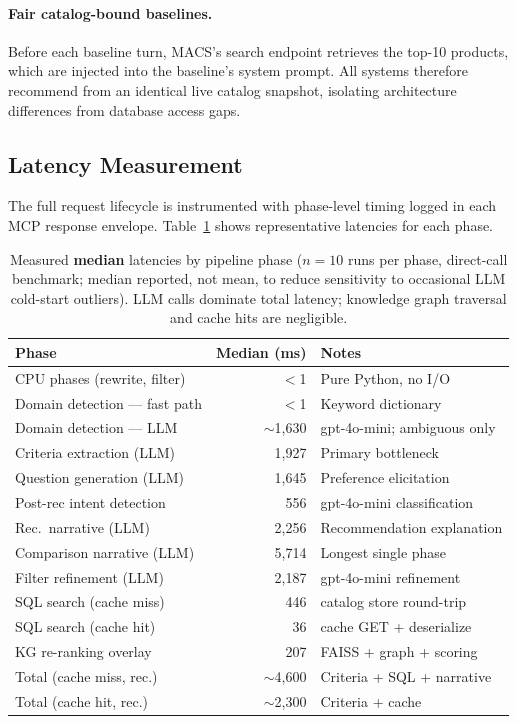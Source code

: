 \documentclass[sigconf,anonymous]{acmart}
\begin{document}
\paragraph{Fair catalog-bound baselines.}
Before each baseline turn, MACS's search endpoint retrieves the top-10
products, which are injected into the baseline's system prompt. All systems
therefore recommend from an identical live catalog snapshot, isolating
architecture differences from database access gaps.

\subsection{Latency Measurement}

The full request lifecycle is instrumented with phase-level timing logged in
each MCP response envelope. Table~\ref{tab:latency} shows representative
latencies for each phase.

\begin{table}[t]
  \caption{Measured \textbf{median} latencies by pipeline phase ($n = 10$
  runs per phase, direct-call benchmark; median reported, not mean, to
  reduce sensitivity to occasional LLM cold-start outliers). LLM calls
  dominate total latency; knowledge graph traversal and cache hits are
  negligible.}
  \label{tab:latency}
  \small
  \begin{tabular}{@{}lrp{2.5cm}@{}}
    \toprule
    Phase & Median (ms) & Notes \\
    \midrule
    CPU phases (rewrite, filter)  &   $<$1        & Pure Python, no I/O \\
    Domain detection — fast path  &   $<$1        & Keyword dictionary \\
    Domain detection — LLM        & $\sim$1{,}630 & gpt-4o-mini; ambiguous only \\
    Criteria extraction (LLM)     & 1{,}927       & Primary bottleneck \\
    Question generation (LLM)     & 1{,}645       & Preference elicitation \\
    Post-rec intent detection     &   556         & gpt-4o-mini classification \\
    Rec.\ narrative (LLM)         & 2{,}256       & Recommendation explanation \\
    Comparison narrative (LLM)    & 5{,}714       & Longest single phase \\
    Filter refinement (LLM)       & 2{,}187       & gpt-4o-mini refinement \\
    SQL search (cache miss)       &   446         & catalog store round-trip \\
    SQL search (cache hit)        &    36         & cache GET + deserialize \\
    KG re-ranking overlay         &   207         & FAISS + graph + scoring \\
    Total (cache miss, rec.)      & $\sim$4{,}600 & Criteria + SQL + narrative \\
    Total (cache hit, rec.)       & $\sim$2{,}300 & Criteria + cache \\
    \bottomrule
  \end{tabular}
\end{table}
\end{document}
